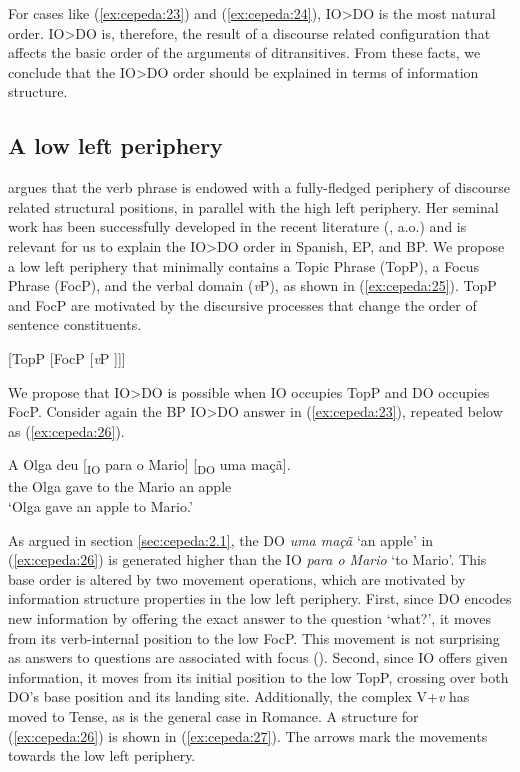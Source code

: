 \documentclass[output=paper,colorlinks,citecolor=brown,nonflat]{./langscibook}
\begin{document}
For cases like (\ref{ex:cepeda:23}) and (\ref{ex:cepeda:24}), IO>DO is the most natural order. IO>DO is, therefore, the result of a discourse related configuration that affects the basic order of the arguments of ditransitives. From these facts, we conclude that the IO>DO order should be explained in terms of information structure.

\subsection{A low left periphery}\label{sec:cepeda:3.2}

\citet{Belletti2004Chapter} argues that the verb phrase is endowed with a fully-fledged periphery of discourse related structural positions, in parallel with the high left periphery. Her seminal work has been successfully developed in the recent literature (\citealt{Mioto2003, Quarezemin2005, Jiménez-Fernández2009}, a.o.) and is relevant for us to explain the IO>DO order in Spanish, EP, and BP. We propose a low left periphery that minimally contains a Topic Phrase (TopP), a Focus Phrase (FocP), and the verbal domain (\textit{v}P), as shown in (\ref{ex:cepeda:25}). TopP and FocP are motivated by the discursive processes that change the order of sentence constituents.

\ea%
    \label{ex:cepeda:25}{}
	[TopP [FocP [\textit{v}P ]]]
\z

We propose that IO>DO is possible when IO occupies TopP and DO occupies FocP. Consider again the BP IO>DO answer in (\ref{ex:cepeda:23}), repeated below as (\ref{ex:cepeda:26}).

\ea%
    \label{ex:cepeda:26}
	\gll A   Olga deu [\textsubscript{IO} para o   Mario] [\textsubscript{DO} uma maçã].\\
		the Olga gave \hspaceThis{[\textsubscript{IO}} to the Mario  \hspaceThis{[\textsubscript{DO}} an apple\\
	\glt ‘Olga gave an apple to Mario.’
\z

As argued in section \ref{sec:cepeda:2.1}, the DO \textit{uma maçã} ‘an apple’ in (\ref{ex:cepeda:26}) is generated higher than the IO \textit{para o Mario} ‘to Mario’. This base order is altered by two movement operations, which are motivated by information structure properties in the low left periphery. First, since DO encodes new information by offering the exact answer to the question ‘what?’, it moves from its verb-internal position to the low FocP. This movement is not surprising as answers to questions are associated with focus (\citealt{Rooth1992}). Second, since IO offers given information, it moves from its initial position to the low TopP, crossing over both DO’s base position and its landing site. Additionally, the complex V+\textit{v} has moved to Tense, as is the general case in Romance. A structure for (\ref{ex:cepeda:26}) is shown in (\ref{ex:cepeda:27}). The arrows mark the movements towards the low left periphery.
\end{document}
